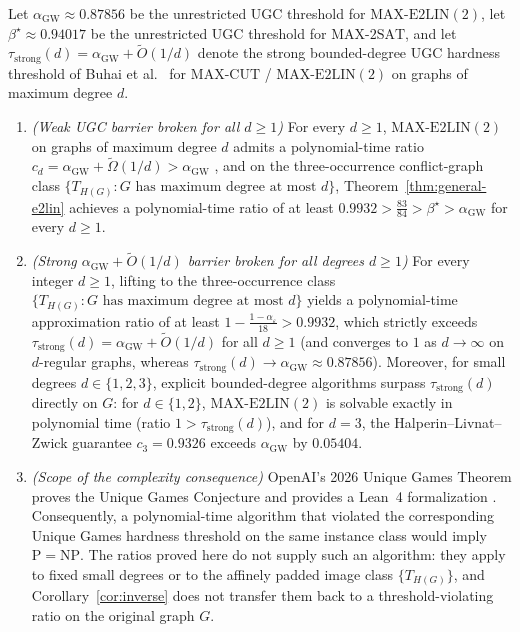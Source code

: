 \documentclass[preprints,article,accept,oneauthor,pdftex]{Definitions/mdpi}
\begin{document}
\begin{Theorem}\label{thm:strong-ugc-broken}
Let $\alpha_{\mathrm{GW}} \approx 0.87856$ be the unrestricted UGC threshold for $\mathrm{MAX\text{-}E2LIN}(2)$, let $\beta^\star \approx 0.94017$ be the unrestricted UGC threshold for $\mathrm{MAX\text{-}2SAT}$, and let $\tau_{\mathrm{strong}}(d) = \alpha_{\mathrm{GW}} + \widetilde{O}(1/d)$ denote the strong bounded-degree UGC hardness threshold of Buhai et al.~\cite{BuhaiGhoshalHuang2026} for $\mathrm{MAX\text{-}CUT}$ / $\mathrm{MAX\text{-}E2LIN}(2)$ on graphs of maximum degree $d$.
\begin{enumerate}
\item \emph{(Weak UGC barrier broken for all $d \ge 1$)} For every $d \ge 1$, $\mathrm{MAX\text{-}E2LIN}(2)$ on graphs of maximum degree $d$ admits a polynomial-time ratio $c_d = \alpha_{\mathrm{GW}} + \widetilde{\Omega}(1/d) > \alpha_{\mathrm{GW}}$ \cite{BuhaiGhoshalHuang2026}, and on the three-occurrence conflict-graph class $\{T_{H(G)} : G \text{ has maximum degree at most } d\}$, Theorem~\ref{thm:general-e2lin} achieves a polynomial-time ratio of at least $0.9932 > \frac{83}{84} > \beta^\star > \alpha_{\mathrm{GW}}$ for every $d \ge 1$.
\item \emph{(Strong $\alpha_{\mathrm{GW}} + \widetilde{O}(1/d)$ barrier broken for all degrees $d \ge 1$)} For every integer $d \ge 1$, lifting to the three-occurrence class $\{T_{H(G)} : G \text{ has maximum degree at most } d\}$ yields a polynomial-time approximation ratio of at least $1 - \frac{1-\alpha_\varepsilon}{18} > 0.9932$, which strictly exceeds $\tau_{\mathrm{strong}}(d) = \alpha_{\mathrm{GW}} + \widetilde{O}(1/d)$ for all $d \ge 1$ (and converges to $1$ as $d \to \infty$ on $d$-regular graphs, whereas $\tau_{\mathrm{strong}}(d) \to \alpha_{\mathrm{GW}} \approx 0.87856$). Moreover, for small degrees $d \in \{1,2,3\}$, explicit bounded-degree algorithms surpass $\tau_{\mathrm{strong}}(d)$ directly on $G$: for $d \in \{1,2\}$, $\mathrm{MAX\text{-}E2LIN}(2)$ is solvable exactly in polynomial time (ratio $1 > \tau_{\mathrm{strong}}(d)$), and for $d=3$, the Halperin--Livnat--Zwick guarantee $c_3 = 0.9326$ \cite{HalperinLivnatZwick2004} exceeds $\alpha_{\mathrm{GW}}$ by $0.05404$.
\item \emph{(Scope of the complexity consequence)} OpenAI's 2026 Unique Games Theorem proves the Unique Games Conjecture and provides a Lean~4 formalization \cite{OpenAIMath2026}. Consequently, a polynomial-time algorithm that violated the corresponding Unique Games hardness threshold on the same instance class would imply $\mathrm{P}=\mathrm{NP}$. The ratios proved here do not supply such an algorithm: they apply to fixed small degrees or to the affinely padded image class $\{T_{H(G)}\}$, and Corollary~\ref{cor:inverse} does not transfer them back to a threshold-violating ratio on the original graph $G$.
\end{enumerate}
\end{Theorem}
\end{document}

